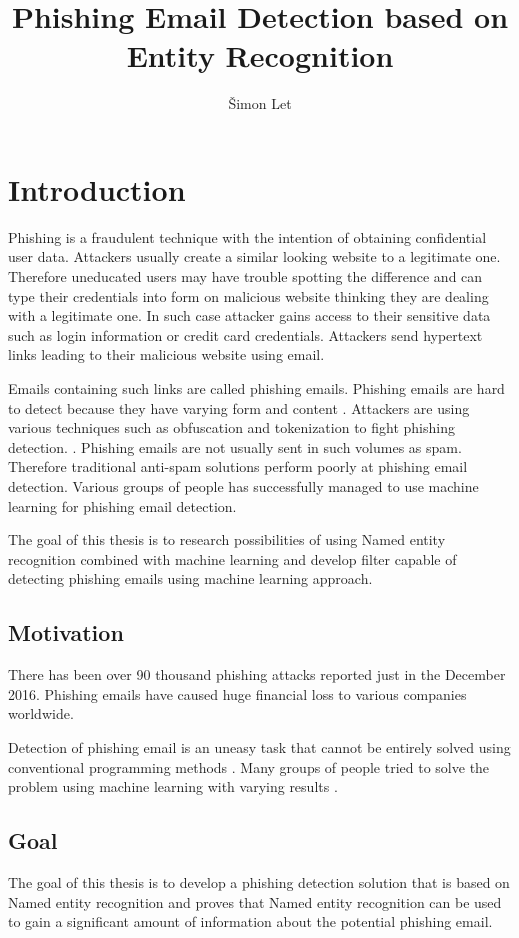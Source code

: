 \documentclass[thesis=B,english]{FITthesis}[2012/10/20]
\title{Phishing Email Detection based on Entity Recognition}
\author{{\v S}imon Let} %
\begin{document}
\chapter{Introduction}
Phishing is a fraudulent technique with the intention of obtaining confidential user data.  Attackers usually create a similar looking website to a legitimate one. Therefore uneducated users may have trouble spotting the difference and can type their credentials into form on malicious website thinking they are dealing with a legitimate one. In such case attacker gains access to their sensitive data such as login information or credit card credentials. Attackers send hypertext links leading to their malicious website using email.

\par Emails containing such links are called phishing emails. Phishing emails are hard to detect because they have varying form and content \cite{wittel2004attacking}. Attackers are using various techniques such as obfuscation and tokenization to fight phishing detection. \cite{wittel2004attacking}. Phishing emails are not usually sent in such volumes as spam. Therefore traditional anti-spam solutions perform poorly at phishing email detection. Various groups of people has successfully managed to use machine learning for phishing email detection.

\par The goal of this thesis is to research possibilities of using Named entity recognition combined with machine learning and develop filter capable of detecting phishing emails using machine learning approach.

\section{Motivation}
There has been over 90 thousand phishing attacks reported just in the December 2016. \cite{falk2016cerias} Phishing emails have caused huge financial loss to various companies worldwide. \cite{apwg}
\par Detection of phishing email is an uneasy task that cannot be entirely solved using conventional programming methods \cite{falk2016cerias}. Many groups of people tried to solve the problem using machine learning with varying results \cite{fette2007learning} \cite{features2006Chandrasekaran} \cite{featuresBasnet2008detection} \cite{refdByIndia}.  

\section{Goal}
The goal of this thesis is to develop a phishing detection solution that is based on Named entity recognition and proves that Named entity recognition can be used to gain a significant amount of information about the potential phishing email.
\end{document}
